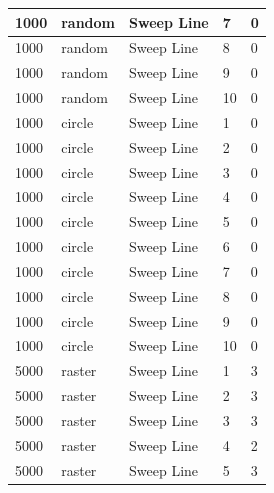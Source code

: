 \documentclass[12pt]{article}
\begin{document}
\begin{longtable}{|l|l|l|l|l|}
1000         & random            & Sweep Line & 7          & 0                             \\ \hline
1000         & random            & Sweep Line & 8          & 0                             \\ \hline
1000         & random            & Sweep Line & 9          & 0                             \\ \hline
1000         & random            & Sweep Line & 10         & 0                             \\ \hline
1000         & circle            & Sweep Line & 1          & 0                             \\ \hline
1000         & circle            & Sweep Line & 2          & 0                             \\ \hline
1000         & circle            & Sweep Line & 3          & 0                             \\ \hline
1000         & circle            & Sweep Line & 4          & 0                             \\ \hline
1000         & circle            & Sweep Line & 5          & 0                             \\ \hline
1000         & circle            & Sweep Line & 6          & 0                             \\ \hline
1000         & circle            & Sweep Line & 7          & 0                             \\ \hline
1000         & circle            & Sweep Line & 8          & 0                             \\ \hline
1000         & circle            & Sweep Line & 9          & 0                             \\ \hline
1000         & circle            & Sweep Line & 10         & 0                             \\ \hline
5000         & raster            & Sweep Line & 1          & 3                             \\ \hline
5000         & raster            & Sweep Line & 2          & 3                             \\ \hline
5000         & raster            & Sweep Line & 3          & 3                             \\ \hline
5000         & raster            & Sweep Line & 4          & 2                             \\ \hline
5000         & raster            & Sweep Line & 5          & 3                             \\ \hline

\end{longtable}
\end{document}
